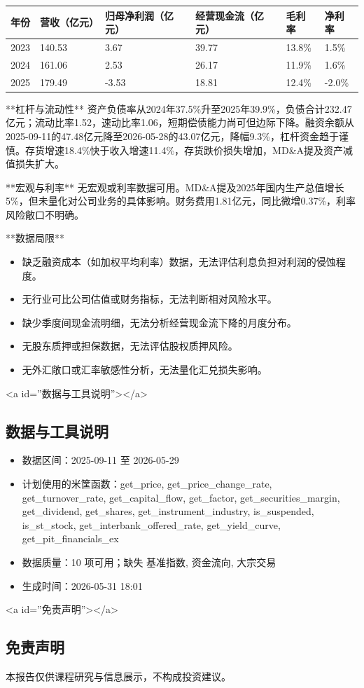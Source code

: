 \documentclass[12pt,a4paper]{article}
\begin{document}
\begin{table}[htbp]
\centering
\begin{tabular}{llllll}
\toprule
年份 & 营收（亿元） & 归母净利润（亿元） & 经营现金流（亿元） & 毛利率 & 净利率 \\
\midrule
2023 & 140.53 & 3.67 & 39.77 & 13.8\% & 1.5\% \\
2024 & 161.06 & 2.53 & 26.17 & 11.9\% & 1.6\% \\
2025 & 179.49 & -3.53 & 18.81 & 12.4\% & -2.0\% \\
\bottomrule
\end{tabular}
\end{table}


**杠杆与流动性**
资产负债率从2024年37.5\%升至2025年39.9\%，负债合计232.47亿元；流动比率1.52，速动比率1.06，短期偿债能力尚可但边际下降。融资余额从2025-09-11的47.48亿元降至2026-05-28的43.07亿元，降幅9.3\%，杠杆资金趋于谨慎。存货增速18.4\%快于收入增速11.4\%，存货跌价损失增加，MD\&A提及资产减值损失扩大。

**宏观与利率**
无宏观或利率数据可用。MD\&A提及2025年国内生产总值增长5\%，但未量化对公司业务的具体影响。财务费用1.81亿元，同比微增0.37\%，利率风险敞口不明确。

**数据局限**
\begin{itemize}
\item 缺乏融资成本（如加权平均利率）数据，无法评估利息负担对利润的侵蚀程度。
\item 无行业可比公司估值或财务指标，无法判断相对风险水平。
\item 缺少季度间现金流明细，无法分析经营现金流下降的月度分布。
\item 无股东质押或担保数据，无法评估股权质押风险。
\item 无外汇敞口或汇率敏感性分析，无法量化汇兑损失影响。
\end{itemize}

<a id=''数据与工具说明''></a>

\subsection{ 数据与工具说明}
\begin{itemize}
\item 数据区间：2025-09-11 至 2026-05-29
\item 计划使用的米筐函数：get\_price, get\_price\_change\_rate, get\_turnover\_rate, get\_capital\_flow, get\_factor, get\_securities\_margin, get\_dividend, get\_shares, get\_instrument\_industry, is\_suspended, is\_st\_stock, get\_interbank\_offered\_rate, get\_yield\_curve, get\_pit\_financials\_ex
\item 数据质量：10 项可用；缺失 基准指数, 资金流向, 大宗交易
\item 生成时间：2026-05-31 18:01
\end{itemize}

<a id=''免责声明''></a>

\subsection{ 免责声明}
本报告仅供课程研究与信息展示，不构成投资建议。
\end{document}

